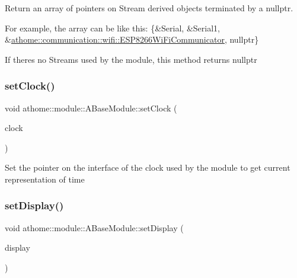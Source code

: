 Return an array of pointers on {\ttfamily Stream} derived objects terminated by a {\ttfamily nullptr}.

For example, the array can be like this\+: {\ttfamily \{\&Serial, \&Serial1, \&\mbox{\hyperlink{classathome_1_1communication_1_1wifi_1_1_e_s_p8266_wi_fi_communicator}{athome\+::communication\+::wifi\+::\+E\+S\+P8266\+Wi\+Fi\+Communicator}}, nullptr\}}

If there\textquotesingle{}s no {\ttfamily Stream}s used by the module, this method returns {\ttfamily nullptr} \mbox{\label{classathome_1_1module_1_1_a_base_module_a98621be03deb721373010be2a16dc585}} 
\subsubsection{\texorpdfstring{set\+Clock()}{setClock()}}
{\footnotesize\ttfamily void athome\+::module\+::\+A\+Base\+Module\+::set\+Clock (\begin{DoxyParamCaption}\item[{\mbox{\hyperlink{structathome_1_1time_1_1_i_time}{time\+::\+I\+Time}} $\ast$}]{clock }\end{DoxyParamCaption})}

Set the pointer on the interface of the clock used by the module to get current representation of time \mbox{\label{classathome_1_1module_1_1_a_base_module_a451a1fb99905c7d21f3a818ee39acc69}} 
\subsubsection{\texorpdfstring{set\+Display()}{setDisplay()}}
{\footnotesize\ttfamily void athome\+::module\+::\+A\+Base\+Module\+::set\+Display (\begin{DoxyParamCaption}\item[{\mbox{\hyperlink{classathome_1_1display_1_1_i_display}{display\+::\+I\+Display}} $\ast$}]{display }\end{DoxyParamCaption})}

